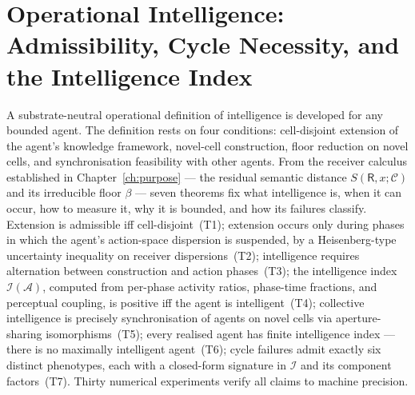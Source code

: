 
\providecommand{\receiver}{\mathsf{R}}
\providecommand{\agent}{\mathcal{A}}
\providecommand{\Cell}{\mathcal{C}}
\providecommand{\Sfloor}{S_{\flat}}
\providecommand{\Mode}{\mathfrak{M}}
\providecommand{\Mfld}{\mathcal{M}}
\providecommand{\Pot}{\Phi}
\newcommand{\KFW}{\mathcal{K}}
\newcommand{\Iindex}{\mathcal{I}}
\newcommand{\Acon}{A_{\mathrm{con}}}
\newcommand{\Aact}{A_{\mathrm{act}}}
\newcommand{\Tcon}{T_{\mathrm{con}}}
\newcommand{\hbarA}{\hbar_{\!\mathcal{A}}}

\chapter{Operational Intelligence: Admissibility, Cycle Necessity, and the Intelligence Index}
\label{ch:intelligence}


\begin{chapterabstract}
A substrate-neutral operational definition of intelligence is developed for any bounded
agent. The definition rests on four conditions: cell-disjoint extension of the agent's
knowledge framework, novel-cell construction, floor reduction on novel cells, and
synchronisation feasibility with other agents. From the receiver calculus established in
Chapter~\ref{ch:purpose} --- the residual semantic distance $S(\receiver, x; \Cell)$
and its irreducible floor $\beta$ --- seven theorems fix what intelligence is, when it
can occur, how to measure it, why it is bounded, and how its failures classify.
Extension is admissible iff cell-disjoint~(T1); extension occurs only during phases in
which the agent's action-space dispersion is suspended, by a Heisenberg-type uncertainty
inequality on receiver dispersions~(T2); intelligence requires alternation between
construction and action phases~(T3); the intelligence index $\Iindex(\agent)$, computed
from per-phase activity ratios, phase-time fractions, and perceptual coupling, is
positive iff the agent is intelligent~(T4); collective intelligence is precisely
synchronisation of agents on novel cells via aperture-sharing isomorphisms~(T5); every
realised agent has finite intelligence index --- there is no maximally intelligent
agent~(T6); cycle failures admit exactly six distinct phenotypes, each with a closed-form
signature in $\Iindex$ and its component factors~(T7). Thirty numerical experiments
verify all claims to machine precision.
\end{chapterabstract}

